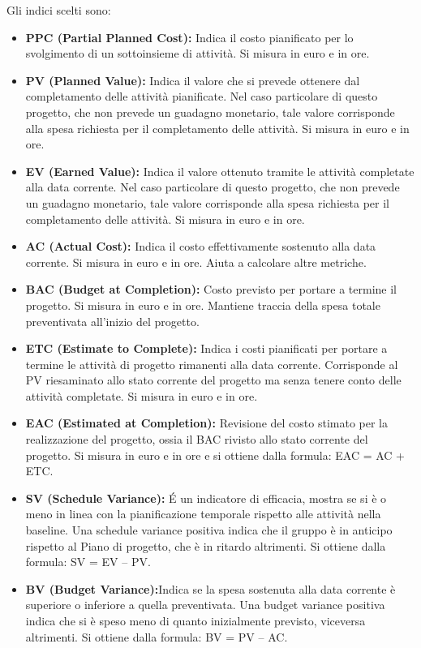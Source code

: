 \documentclass[a4paper]{article}
\begin{document}
				Gli indici scelti sono:
				\begin{itemize}
					\item \textbf{PPC (Partial Planned Cost):} Indica il costo pianificato per lo svolgimento di un sottoinsieme
					di attività. Si misura in euro e in ore.
					\item \textbf{PV (Planned Value):} Indica il valore che si prevede ottenere dal completamento delle attività
					pianificate. Nel caso particolare di questo progetto, che non prevede un guadagno monetario, tale valore
					corrisponde alla spesa richiesta per il completamento delle attività.
					Si misura in euro e in ore.
					\item \textbf{EV (Earned Value):} Indica il valore ottenuto tramite le attività completate alla data 
					corrente. Nel caso particolare di questo progetto, che non prevede un guadagno monetario, tale valore
					corrisponde alla spesa richiesta per il completamento delle attività.
					Si misura in euro e in ore.
					\item \textbf{AC (Actual Cost):} Indica il costo effettivamente sostenuto alla data corrente.
					Si misura in euro e in ore. Aiuta a calcolare altre metriche.
					\item \textbf{BAC (Budget at Completion):} Costo previsto per portare a termine il progetto.
					Si misura in euro e in ore. Mantiene traccia della spesa totale preventivata all'inizio del progetto.
					\item \textbf{ETC (Estimate to Complete):} Indica i costi pianificati per portare a termine le attività di
					progetto rimanenti alla data corrente. Corrisponde al PV riesaminato allo stato corrente del progetto ma
					senza tenere conto delle attività completate. 
					Si misura in euro e in ore.
					\item \textbf{EAC (Estimated at Completion):} Revisione del costo stimato per la realizzazione del progetto, 
					ossia il BAC rivisto allo stato corrente del progetto. Si misura in euro e in ore e si ottiene dalla formula:
					  EAC = AC + ETC. 
					\item \textbf{SV (Schedule Variance):} É un indicatore di efficacia, mostra se si è o meno in linea con la
					pianificazione temporale rispetto alle attività nella baseline. Una schedule variance positiva indica che il
					gruppo è in anticipo rispetto al Piano di progetto, che è in ritardo altrimenti.
					Si ottiene dalla formula: SV = EV – PV.
					\item \textbf{BV (Budget Variance):}Indica se la spesa sostenuta alla data corrente è superiore o inferiore a
					quella preventivata. Una budget variance positiva indica che si è speso meno di quanto inizialmente previsto,
					viceversa altrimenti. Si ottiene dalla formula: BV = PV – AC.
			\end{itemize} 
\end{document}
